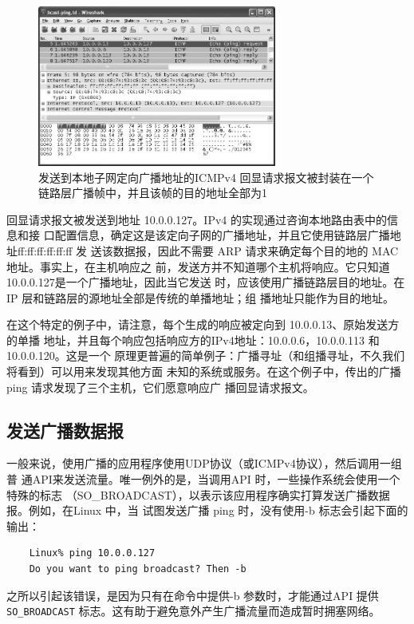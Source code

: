 \begin{figure}[ht]
    \centering
	\includegraphics[width=0.7\textwidth]{imgs/9/9-1.png}
	\caption{发送到本地子网定向广播地址的ICMPv4 回显请求报文被封装在一个链路层广播帧中，并且该帧的目的地址全部为1}
\end{figure}

回显请求报文被发送到地址 10.0.0.127。IPv4 的实现通过咨询本地路由表中的信息和接
口配置信息，确定这是该定向子网的广播地址，并且它使用链路层广播地址ff:ff:ff:ff:ff:ff 发
送该数据报，因此不需要 ARP 请求来确定每个目的地的 MAC地址。事实上，在主机响应之
前，发送方并不知道哪个主机将响应。它只知道10.0.0.127是一个广播地址，因此当它发送
时，应该使用广播链路层目的地址。在IP 层和链路层的源地址全部是传统的单播地址；组
播地址只能作为目的地址。

在这个特定的例子中，请注意，每个生成的响应被定向到 10.0.0.13、原始发送方的单播
地址，并且每个响应包括响应方的IPv4地址：10.0.0.6，10.0.0.113 和 10.0.0.120。这是一个
原理更普遍的简单例子：广播寻址（和组播寻址，不久我们将看到）可以用来发现其他方面
未知的系统或服务。在这个例子中，传出的广播 ping 请求发现了三个主机，它们愿意响应广
播回显请求报文。

\subsection{发送广播数据报}
一般来说，使用广播的应用程序使用UDP协议（或ICMPv4协议），然后调用一组普
通API来发送流量。唯一例外的是，当调用API 时，一些操作系统会使用一个特殊的标志
（SO\_BROADCAST），以表示该应用程序确实打算发送广播数据报。例如，在Linux 中，当
试图发送广播 ping 时，没有使用-b 标志会引起下面的输出：

\begin{verbatim}
    Linux% ping 10.0.0.127
    Do you want to ping broadcast? Then -b
\end{verbatim}

之所以引起该错误，是因为只有在命令中提供-b 参数时，才能通过API 提供\verb|SO_BROADCAST|
标志。这有助于避免意外产生广播流量而造成暂时拥塞网络。

